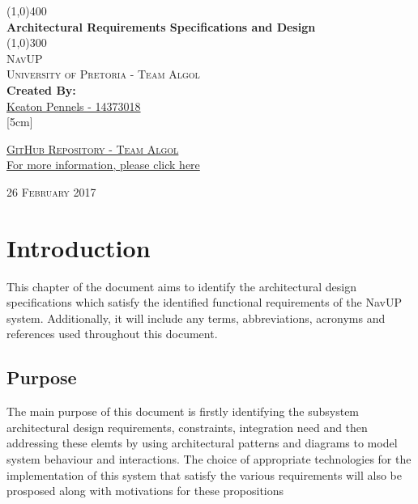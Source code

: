 \documentclass{article}
\begin{document}
	\begin{titlepage}
		\begin{center}

			\line(1,0){400}\\
			[6mm]
			\huge{
				\bfseries Architectural Requirements Specifications and Design
			}\\
			[2mm]
			\line(1,0){300}\\
			[15mm]
			\textsc{\large NavUP}\\
			[7.5mm]
			\textsc{\large University of Pretoria - Team Algol}\\
			[20mm]
			\large{\textbf{Created By:}}\\
			[2mm]
			\large{
				\href{https://github.com/KeatonPennels}{Keaton Pennels - 14373018}\\
			}
			[5cm]

		\href{https://github.com/Chris19951225/COS-301-Team-Algol}{\textsc{\Large GitHub Repository - Team Algol}\\[2mm]
		  For more information, please click here}
		\end{center}
		\begin{flushright}
			\textsc{\large 26 February 2017}
		\end{flushright}
	\end{titlepage}

	\cleardoublepage
	\thispagestyle{empty}
	\tableofcontents
	\cleardoublepage

	\thispagestyle{empty}
	\listoffigures
	\cleardoublepage
	\setcounter{page}{1}
	
	
	\section{Introduction}\label{sec:intro}
		This chapter of the document aims to identify the architectural design specifications which satisfy the identified functional requirements of the NavUP system. Additionally, it will include any terms, abbreviations, acronyms and references used throughout this document.
	
		\subsection{Purpose}\label{subsec:purpose}
			The main purpose of this document is firstly identifying the subsystem architectural design requirements, constraints, integration need  and then addressing these elemts by using architectural patterns and diagrams to model system behaviour and interactions. The choice of appropriate technologies for the implementation of this system that satisfy the various requirements will also be prosposed along with motivations for these propositions 
				
\end{document}
